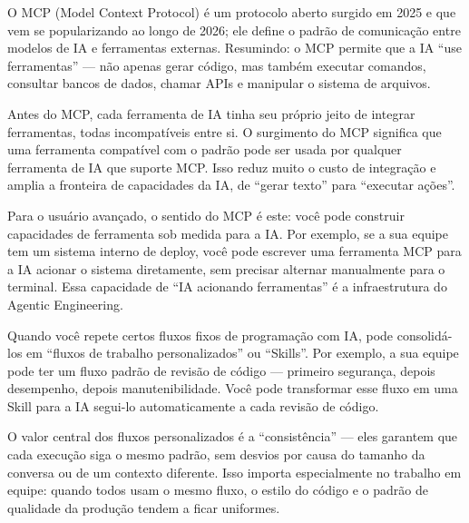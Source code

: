 


O MCP (Model Context Protocol) é um protocolo aberto surgido em 2025 e que vem se popularizando ao longo de 2026; ele define o padrão de comunicação entre modelos de IA e ferramentas externas. Resumindo: o MCP permite que a IA “use ferramentas” — não apenas gerar código, mas também executar comandos, consultar bancos de dados, chamar APIs e manipular o sistema de arquivos.

Antes do MCP, cada ferramenta de IA tinha seu próprio jeito de integrar ferramentas, todas incompatíveis entre si. O surgimento do MCP significa que uma ferramenta compatível com o padrão pode ser usada por qualquer ferramenta de IA que suporte MCP. Isso reduz muito o custo de integração e amplia a fronteira de capacidades da IA, de “gerar texto” para “executar ações”.

Para o usuário avançado, o sentido do MCP é este: você pode construir capacidades de ferramenta sob medida para a IA. Por exemplo, se a sua equipe tem um sistema interno de deploy, você pode escrever uma ferramenta MCP para a IA acionar o sistema diretamente, sem precisar alternar manualmente para o terminal. Essa capacidade de “IA acionando ferramentas” é a infraestrutura do Agentic Engineering.


Quando você repete certos fluxos fixos de programação com IA, pode consolidá-los em “fluxos de trabalho personalizados” ou “Skills”. Por exemplo, a sua equipe pode ter um fluxo padrão de revisão de código — primeiro segurança, depois desempenho, depois manutenibilidade. Você pode transformar esse fluxo em uma Skill para a IA segui-lo automaticamente a cada revisão de código.

O valor central dos fluxos personalizados é a “consistência” — eles garantem que cada execução siga o mesmo padrão, sem desvios por causa do tamanho da conversa ou de um contexto diferente. Isso importa especialmente no trabalho em equipe: quando todos usam o mesmo fluxo, o estilo do código e o padrão de qualidade da produção tendem a ficar uniformes.

